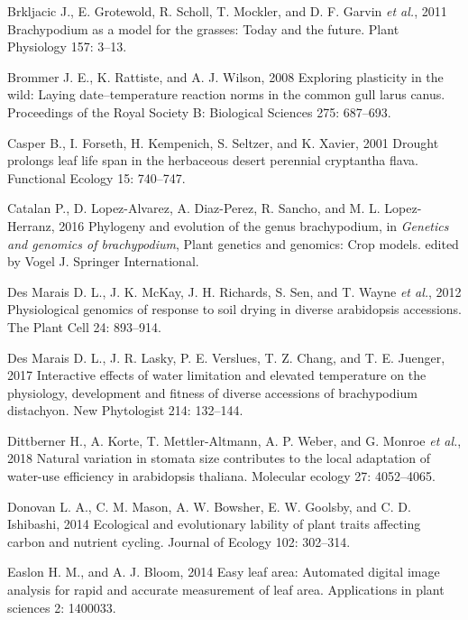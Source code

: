 \documentclass[jou,floatsintext]{apa6}
\begin{document}
\leavevmode\hypertarget{ref-brkljacic2011brachypodium}{}%
Brkljacic J., E. Grotewold, R. Scholl, T. Mockler, and D. F. Garvin \emph{et al.}, 2011 Brachypodium as a model for the grasses: Today and the future. Plant Physiology 157: 3--13.

\leavevmode\hypertarget{ref-brommer2008exploring}{}%
Brommer J. E., K. Rattiste, and A. J. Wilson, 2008 Exploring plasticity in the wild: Laying date--temperature reaction norms in the common gull larus canus. Proceedings of the Royal Society B: Biological Sciences 275: 687--693.

\leavevmode\hypertarget{ref-casper2001drought}{}%
Casper B., I. Forseth, H. Kempenich, S. Seltzer, and K. Xavier, 2001 Drought prolongs leaf life span in the herbaceous desert perennial cryptantha flava. Functional Ecology 15: 740--747.

\leavevmode\hypertarget{ref-catalan2016phylogeny}{}%
Catalan P., D. Lopez-Alvarez, A. Diaz-Perez, R. Sancho, and M. L. Lopez-Herranz, 2016 Phylogeny and evolution of the genus brachypodium, in \emph{Genetics and genomics of brachypodium}, Plant genetics and genomics: Crop models. edited by Vogel J. Springer International.

\leavevmode\hypertarget{ref-des2012physiological}{}%
Des Marais D. L., J. K. McKay, J. H. Richards, S. Sen, and T. Wayne \emph{et al.}, 2012 Physiological genomics of response to soil drying in diverse arabidopsis accessions. The Plant Cell 24: 893--914.

\leavevmode\hypertarget{ref-des2017interactive}{}%
Des Marais D. L., J. R. Lasky, P. E. Verslues, T. Z. Chang, and T. E. Juenger, 2017 Interactive effects of water limitation and elevated temperature on the physiology, development and fitness of diverse accessions of brachypodium distachyon. New Phytologist 214: 132--144.

\leavevmode\hypertarget{ref-dittberner2018natural}{}%
Dittberner H., A. Korte, T. Mettler-Altmann, A. P. Weber, and G. Monroe \emph{et al.}, 2018 Natural variation in stomata size contributes to the local adaptation of water-use efficiency in arabidopsis thaliana. Molecular ecology 27: 4052--4065.

\leavevmode\hypertarget{ref-donovan2014ecological}{}%
Donovan L. A., C. M. Mason, A. W. Bowsher, E. W. Goolsby, and C. D. Ishibashi, 2014 Ecological and evolutionary lability of plant traits affecting carbon and nutrient cycling. Journal of Ecology 102: 302--314.

\leavevmode\hypertarget{ref-easlon2014easy}{}%
Easlon H. M., and A. J. Bloom, 2014 Easy leaf area: Automated digital image analysis for rapid and accurate measurement of leaf area. Applications in plant sciences 2: 1400033.
\end{document}
